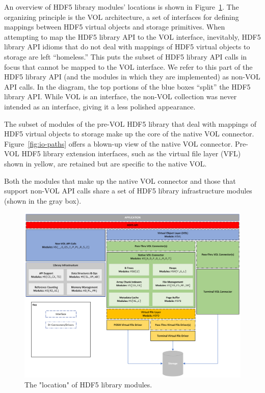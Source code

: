 

An overview of HDF5 library modules' locations is shown in Figure~\ref{fig:module-location}. The organizing principle is the VOL architecture, a set of interfaces for defining mappings between HDF5 virtual objects and storage primitives. When attempting to map the HDF5 library API to the VOL interface, inevitably, HDF5 library API idioms that do not deal with mappings of HDF5 virtual objects to storage are left ``homeless.'' This puts the subset of HDF5 library API calls in focus that cannot be mapped to the VOL interface. We refer to this part of the HDF5 library API (and the modules in which they are implemented) as non-VOL API calls. In the diagram, the top portions of the blue boxes ``split'' the HDF5 library API. While VOL is an interface, the non-VOL collection was never intended as an interface, giving it a less polished appearance.

The subset of modules of the pre-VOL HDF5 library that deal with mappings of HDF5 virtual objects to storage make up the core of the native VOL connector. Figure~\ref{fig:io-paths} offers a blown-up view of the native VOL connector.
Pre-VOL HDF5 library extension interfaces, such as the virtual file layer (VFL) shown in yellow, are retained but are specific to the native VOL.

Both the modules that make up the native VOL connector and those that support non-VOL API calls share a set of HDF5 library infrastructure modules (shown in the gray box).

\begin{landscape}
\begin{figure}
\centering
\includegraphics[scale=0.74,angle=90]{images/HDF5 library canvas.png}
\caption{The "location" of HDF5 library modules.\label{fig:module-location}}
\end{figure}
\end{landscape}


